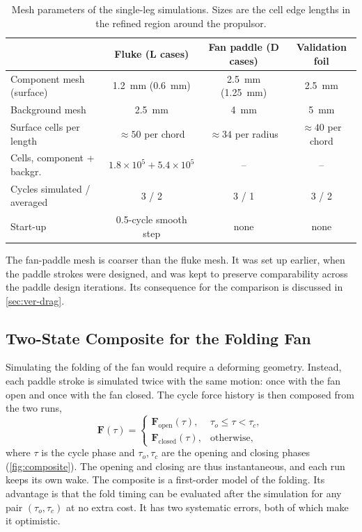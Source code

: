 \begin{table}[t]
  \centering
  \caption[Mesh parameters]{Mesh parameters of the single-leg simulations. Sizes are the cell edge lengths in the
    refined region around the propulsor.}
  \label{tab:meshes}
  \small
  \begin{tabular}{@{}lccc@{}}
    \toprule
    & Fluke (L cases) & Fan paddle (D cases) & Validation foil \\
    \midrule
    Component mesh (surface) & \SI{1.2}{\milli\metre} (\SI{0.6}{\milli\metre}) & \SI{2.5}{\milli\metre} (\SI{1.25}{\milli\metre}) & \SI{2.5}{\milli\metre} \\
    Background mesh & \SI{2.5}{\milli\metre} & \SI{4}{\milli\metre} & \SI{5}{\milli\metre} \\
    Surface cells per length & $\approx50$ per chord & $\approx34$ per radius & $\approx40$ per chord \\
    Cells, component + backgr. & $1.8\times10^5+5.4\times10^5$ & -- & -- \\
    Cycles simulated / averaged & 3 / 2 & 3 / 1 & 3 / 2 \\
    Start-up & 0.5-cycle smooth step & none & none \\
    \bottomrule
  \end{tabular}
\end{table}

The fan-paddle mesh is coarser than the fluke mesh. It was set up earlier, when the paddle strokes were designed,
and was kept to preserve comparability across the paddle design iterations. Its consequence for the comparison
is discussed in \cref{sec:ver-drag}.

\subsection{Two-State Composite for the Folding Fan}
\label{sec:cfd-composite}

Simulating the folding of the fan would require a deforming geometry. Instead, each paddle stroke is simulated
twice with the same motion: once with the fan open and once with the fan closed. The cycle force history is then
composed from the two runs,
\begin{equation}
  \bm F(\tau) = \begin{cases}
    \bm F_\text{open}(\tau), & \tau_o \le \tau < \tau_c,\\
    \bm F_\text{closed}(\tau), & \text{otherwise},
  \end{cases}
  \label{eq:composite}
\end{equation}
where $\tau$ is the cycle phase and $\tau_o,\tau_c$ are the opening and closing phases (\cref{fig:composite}).
The opening and closing are thus instantaneous, and each run keeps its own wake. The composite is a first-order
model of the folding. Its advantage is that the fold timing can be evaluated after the simulation for any pair
$(\tau_o,\tau_c)$ at no extra cost. It has two systematic errors, both of which make it optimistic.

